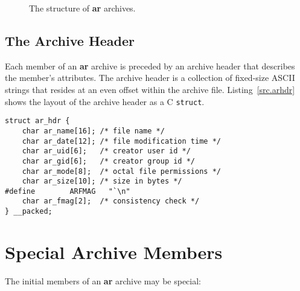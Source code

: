 \documentclass[a4paper,pdftex]{book}
\newcommand{\code}[1]{\texttt{#1}}
\newcommand{\tool}[1]{\textbf{#1}}
\begin{document}
\begin{figure}
  \caption{The structure of \tool{ar} archives.}\label{fig.arstr}
\end{figure}

\subsection{The Archive Header}

Each member of an \tool{ar} archive is preceded by an archive
header that describes the member's
attributes. The archive header is a collection of fixed-size ASCII
strings that resides at an even offset within the archive
file. Listing~\vref{src.arhdr} shows
the layout of the archive header as a C \code{struct}.

\begin{lstlisting}[caption=Archive Header Layout, label=src.arhdr]
struct ar_hdr {
    char ar_name[16]; /* file name */
    char ar_date[12]; /* file modification time */
    char ar_uid[6];   /* creator user id */
    char ar_gid[6];   /* creator group id */
    char ar_mode[8];  /* octal file permissions */
    char ar_size[10]; /* size in bytes */
#define        ARFMAG   "`\n"
    char ar_fmag[2];  /* consistency check */
} __packed;
\end{lstlisting}

\section{Special Archive Members}
The initial members of an \tool{ar} archive may be special:
\end{document}

